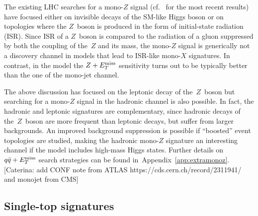 The existing LHC searches for a mono-$Z$ signal (cf.~\cite{Aaboud:2017bja,Sirunyan:2017qfc} for the most recent results) have  focused either on invisible decays of the SM-like Higgs boson or on topologies where the $Z$~boson is produced in the form of initial-state radiation (ISR). Since ISR of a $Z$~boson is compared to the radiation of a gluon suppressed by both the coupling of the~$Z$ and its mass, the mono-$Z$ signal is generically not a discovery channel in models that lead to ISR-like mono-$X$ signatures. In contrast, in the \hdma model the $Z+E_T^\mathrm{miss}$ sensitivity  turns out to be typically better than the one of the mono-jet channel. 

The above discussion has focused on the leptonic decay of the~$Z$~boson but searching for a mono-$Z$ signal in the hadronic channel is also possible. In fact, the hadronic and leptonic signatures  are complementary, since hadronic decays of the~$Z$~boson are more frequent than leptonic decays, but suffer from larger backgrounds. An improved background suppression is possible if ``boosted'' event topologies are studied, making the hadronic mono-$Z$ signature an interesting channel if the \hdma model includes high-mass Higgs states. Further details on $q \bar q + E_T^\mathrm{miss}$ search strategies can be found in~Appendix~\ref{app:extramonoz}. \color{red}[Caterina: add CONF note from ATLAS https://cds.cern.ch/record/2311941/ and monojet from CMS]\color{black}

\subsection*{Single-top signatures}


